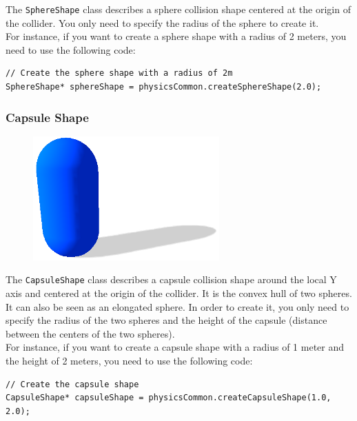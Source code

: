 \documentclass[a4paper,12pt]{article}
\begin{document}
    The \texttt{SphereShape} class describes a sphere collision shape centered at the origin of the collider. You only need to specify the
    radius of the sphere to create it. \\

    For instance, if you want to create a sphere shape with a radius of 2 meters, you need to use the following code: \\

    \begin{lstlisting}
// Create the sphere shape with a radius of 2m
SphereShape* sphereShape = physicsCommon.createSphereShape(2.0);
  \end{lstlisting}

    \vspace{0.6cm}

    \subsubsection{Capsule Shape}

    \begin{figure}[h]
        \centering
        \includegraphics{capsuleshape.png}
        \label{fig:capsuleshape}
    \end{figure}

    The \texttt{CapsuleShape} class describes a capsule collision shape around the local Y axis and centered at the origin of the collider.
    It is the convex hull of two spheres. It can also be seen as an elongated sphere. In order to create it, you only need to specify the
    radius of the two spheres and the height of the capsule (distance between the centers of the two spheres).  \\

    For instance, if you want to create a capsule shape with a radius of 1 meter and the height of 2 meters, you need to use the following code: \\

    \begin{lstlisting}
// Create the capsule shape
CapsuleShape* capsuleShape = physicsCommon.createCapsuleShape(1.0, 2.0);
  \end{lstlisting}
\end{document}
